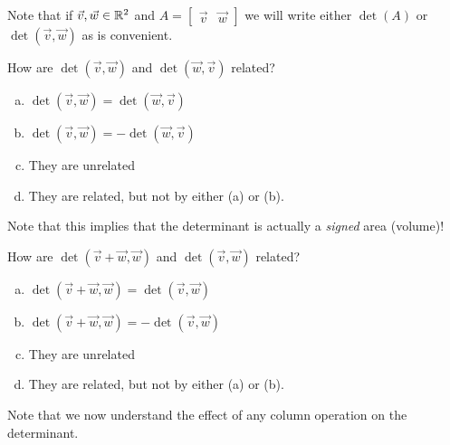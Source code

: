 \begin{applicationActivities}{1}{25}
\begin{observation}
Note that if $\vec{v},\vec{w} \in \mathbb{R}^2$ and $A=\begin{bmatrix} \vec{v} & \vec{w}\end{bmatrix}$ we will write either $\det(A)$ or $\det(\vec{v},\vec{w})$ as is convenient.
\end{observation}

\begin{activity}{0}
How are $\det (\vec{v},\vec{w})$ and $\det(\vec{w},\vec{v})$ related?
\begin{enumerate}[(a)]
\item $\det(\vec{v},\vec{w}) = \det(\vec{w},\vec{v})$
\item $\det(\vec{v},\vec{w}) = -\det(\vec{w},\vec{v})$
\item They are unrelated
\item They are related, but not by either (a) or (b).
\end{enumerate}
\end{activity}


\begin{observation}
Note that this implies that the determinant is actually a \textit{signed} area (volume)!
\end{observation}

\begin{activity}{0}
How are $\det (\vec{v}+\vec{w},\vec{w})$ and $\det(\vec{v},\vec{w})$ related?
\begin{enumerate}[(a)]
\item $\det(\vec{v}+\vec{w},\vec{w}) = \det(\vec{v},\vec{w})$
\item $\det(\vec{v}+\vec{w},\vec{w}) = -\det(\vec{v},\vec{w})$
\item They are unrelated
\item They are related, but not by either (a) or (b).
\end{enumerate}
\end{activity}

\begin{observation}
  Note that we now understand the effect of any column operation on the determinant.
\end{observation}


\end{applicationActivities}
